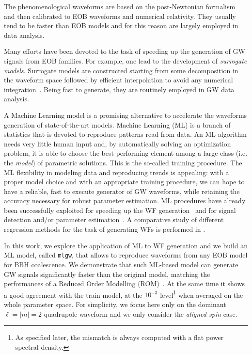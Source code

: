 \documentclass[twocolumn,showpacs,preprintnumbers,nofootinbib,prd,
superscriptaddress,10pt]{revtex4-1}
\begin{document}
The phenomenological waveforms are based on the post-Newtonian formalism and then calibrated 
to  EOB waveforms and numerical relativity. They usually tend to be faster than EOB models and 
for this reason are largely employed in data analysis.

Many efforts have been devoted to the task of speeding up the generation of GW signals from 
EOB families. For example, one lead to the development of \textit{surrogate models}. Surrogate 
models are constructed starting from some decomposition in the waveform space followed by efficient 
interpolation to avoid any  numerical integration~\cite{Purrer:2015tud,Bohe:2016gbl,Purrer:2017str,Lackey:2018zvw,Cotesta:2020qhw}. 
Being fast to generate, they are routinely employed in GW data analysis. 

A Machine Learning model is a promising alternative to accelerate the
waveforms generation of state-of-the-art models.
Machine Learning (ML) is a branch of statistics that is devoted to reproduce patterns read from data. 
An ML algorithm needs very little human input and, by automatically solving an optimization problem, 
it is able to choose the best performing element among a large class (i.e. the \textit{model}) of parametric solutions. 
This is the so-called training procedure. 
The ML flexibility in modeling data and reproducing trends is appealing: with a proper model choice 
and with an appropriate training procedure, we can hope to have a reliable, fast to execute generator 
of GW waveforms, while retaining the accuracy necessary for robust parameter estimation.
ML procedures have already been successfully exploited for speeding up the WF generation~\cite{Khan:2020fso, Chua_2019}
and for signal detection and/or parameter estimation~\cite{Gabbard:2017lja,George:2017pmj,George:2017vlv,Rebei:2018lzh,Chatterjee:2019gqr,Wong:2020wvd, Khan:2020foe}. A comparative study of different regression methods for the task of generating WFs is performed in \cite{Setyawati:2019xzw}.

In this work, we explore the application of ML to WF generation and we build an ML model, called \texttt{mlgw}, that allows to reproduce 
waveforms from any EOB model for BBH coalescence. We demonstrate that such ML-based model can generate 
GW signals significantly faster than the original model, 
matching the performances of a Reduced Order Modelling 
(ROM)~\cite{Purrer:2015tud,Bohe:2016gbl,Purrer:2017str, Field:2013cfa}.  
At the same time it shows a good agreement with the train model, at the $10^{-3}$ level\footnote{
As specified later, the mismatch is always computed with a flat power spectral density.
} when averaged on the whole parameter space. For simplicity, we focus here only on the 
dominant $\ell=|m|=2$ quadrupole waveform and we only consider the \textit{aligned spin} case.
\end{document}
